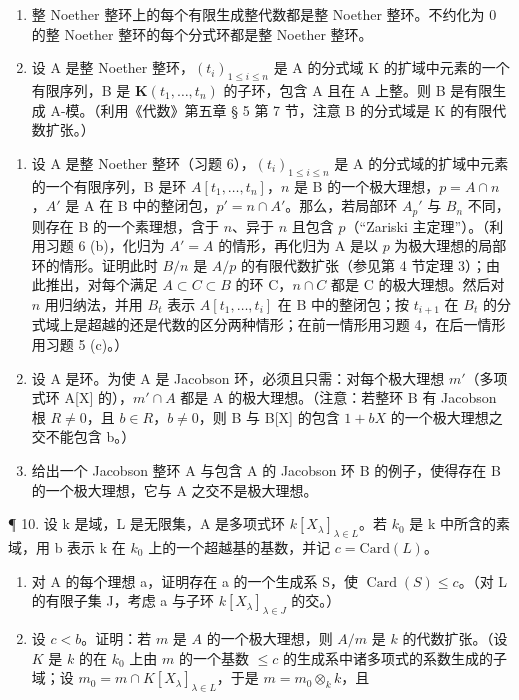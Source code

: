 \begin{enumerate}
\def\labelenumi{(\alph{enumi})}
\item
  整 Noether 整环上的每个有限生成整代数都是整 Noether 整环。不约化为 0 的整 Noether 整环的每个分式环都是整 Noether 整环。
\item
  设 A 是整 Noether 整环，\((t_{i})_{1\leq i\leq n}\) 是 A 的分式域 K 的扩域中元素的一个有限序列，B 是 \(\mathbf{K}(t_{1},\ldots,t_{n})\) 的子环，包含 A 且在 A 上整。则 B 是有限生成 A-模。（利用《代数》第五章 § 5 第 7 节，注意 B 的分式域是 K 的有限代数扩张。）
\end{enumerate}

\begin{enumerate}
\def\labelenumi{\arabic{enumi}.}
\setcounter{enumi}{6}
\item
  设 A 是整 Noether 整环（习题 6），\((t_i)_{1 \leq i \leq n}\) 是 A 的分式域的扩域中元素的一个有限序列，B 是环 \(A[t_1, \ldots, t_n]\)，\(n\) 是 B 的一个极大理想，\(p = A \cap n\)，\(A'\) 是 A 在 B 中的整闭包，\(p' = n \cap A'\)。那么，若局部环 \(A_p'\) 与 \(B_n\) 不同，则存在 B 的一个素理想，含于 \(n\)、异于 \(n\) 且包含 \(p\)（“Zariski 主定理”）。（利用习题 6 (b)，化归为 \(A' = A\) 的情形，再化归为 A 是以 \(p\) 为极大理想的局部环的情形。证明此时 \(B/n\) 是 \(A/p\) 的有限代数扩张（参见第 4 节定理 3）；由此推出，对每个满足 \(A \subset C \subset B\) 的环 C，\(n \cap C\) 都是 C 的极大理想。然后对 \(n\) 用归纳法，并用 \(B_t\) 表示 \(A[t_1, \ldots, t_i]\) 在 B 中的整闭包；按 \(t_{i+1}\) 在 \(B_t\) 的分式域上是超越的还是代数的区分两种情形；在前一情形用习题 4，在后一情形用习题 5 (c)。）
\item
  设 A 是环。为使 A 是 Jacobson 环，必须且只需：对每个极大理想 \(m'\)（多项式环 A{[}X{]} 的），\(m' \cap A\) 都是 A 的极大理想。（注意：若整环 B 有 Jacobson 根 \(R \neq 0\)，且 \(b \in R\)，\(b \neq 0\)，则 B 与 B{[}X{]} 的包含 \(1 + bX\) 的一个极大理想之交不能包含 b。）
\item
  给出一个 Jacobson 整环 A 与包含 A 的 Jacobson 环 B 的例子，使得存在 B 的一个极大理想，它与 A 之交不是极大理想。
\end{enumerate}

¶ 10. 设 k 是域，L 是无限集，A 是多项式环 \(k[X_{\lambda}]_{\lambda \in L}\)。若 \(k_{0}\) 是 k 中所含的素域，用 b 表示 k 在 \(k_{0}\) 上的一个超越基的基数，并记 \(c = \text{Card}(L)\)。

\begin{enumerate}
\def\labelenumi{(\alph{enumi})}
\item
  对 A 的每个理想 a，证明存在 a 的一个生成系 S，使 \(\operatorname{Card}(S) \leqslant c\)。（对 L 的有限子集 J，考虑 a 与子环 \(k[X_{\lambda}]_{\lambda \in J}\) 的交。）
\item
  设 \(c < b\)。证明：若 \(m\) 是 \(A\) 的一个极大理想，则 \(A / m\) 是 \(k\) 的代数扩张。（设 \(K\) 是 \(k\) 的在 \(k_0\) 上由 \(m\) 的一个基数 \(\leqslant c\) 的生成系中诸多项式的系数生成的子域；设 \(m_0 = m \cap K[X_\lambda]_{\lambda \in L}\)，于是 \(m = m_0 \otimes_k k\)，且
\end{enumerate}

